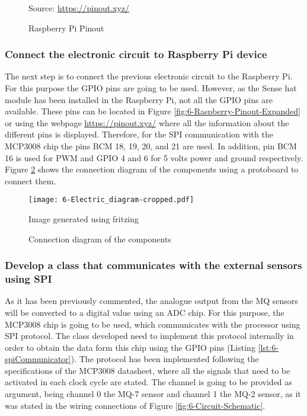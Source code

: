 \begin{figure}[htb]
	\centering
	\caption{Raspberry Pi Pinout}
	\label{fig:6-Raspberry-Pinout}{Source: \url{https://pinout.xyz/}}
\end{figure}




\subsubsection{Connect the electronic circuit to Raspberry Pi device}
The next step is to connect the previous electronic circuit to the Raspberry Pi. For this purpose the GPIO pins are going to be used. However, as the Sense hat module has been installed in the Raspberry Pi, not all the GPIO pins are available. These pins can be located in Figure \ref{fig:6-Raspberry-Pinout-Expanded} or using the webpage \url{https://pinout.xyz/} where all the information about the different pins is displayed. Therefore, for the \ac{SPI} communication with the MCP3008 chip the pins BCM  18, 19, 20, and 21 are used. In addition, pin BCM 16 is used for \ac{PWM} and GPIO 4 and 6 for 5 volts power and ground respectively. Figure \ref{fig:6-Electric_diagram.pdf} shows the connection diagram of the components using a protoboard to connect them.

\begin{figure}[!h]
	\begin{center}
		\texttt{[image: 6-Electric\_diagram-cropped.pdf]}
		\caption{Connection diagram of the components}{Image generated using fritzing}
		\label{fig:6-Electric_diagram.pdf}
	\end{center}
\end{figure}


\subsubsection{Develop a class that communicates with the external sensors using \ac{SPI}}
As it has been previously commented, the analogue output from the MQ sensors will be converted to a digital value using an \ac{ADC} chip. For this purpose, the MCP3008 chip \cite{ADC} is going to be used, which communicates with the processor using \ac{SPI} protocol. The class developed need to implement this protocol internally in order to obtain the data form this chip using the GPIO pins (Listing \ref{lst:6-spiCommunicator}). The protocol has been implemented following the specifications of the MCP3008 datasheet, where all the signals that need to be activated in each clock cycle are stated. The channel is going to be provided as argument, being channel 0 the MQ-7 sensor and channel 1 the MQ-2 sensor, as it was stated in the wiring connections of Figure \ref{fig:6-Circuit-Schematic}.

